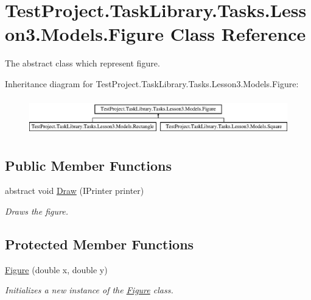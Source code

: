 \hypertarget{class_test_project_1_1_task_library_1_1_tasks_1_1_lesson3_1_1_models_1_1_figure}{}\section{Test\+Project.\+Task\+Library.\+Tasks.\+Lesson3.\+Models.\+Figure Class Reference}
\label{class_test_project_1_1_task_library_1_1_tasks_1_1_lesson3_1_1_models_1_1_figure}


The abstract class which represent figure.  


Inheritance diagram for Test\+Project.\+Task\+Library.\+Tasks.\+Lesson3.\+Models.\+Figure\+:\begin{figure}[H]
\begin{center}
\leavevmode
\includegraphics[height=1.618497cm]{class_test_project_1_1_task_library_1_1_tasks_1_1_lesson3_1_1_models_1_1_figure}
\end{center}
\end{figure}
\subsection*{Public Member Functions}
\begin{DoxyCompactItemize}
\item 
abstract void \mbox{\hyperlink{class_test_project_1_1_task_library_1_1_tasks_1_1_lesson3_1_1_models_1_1_figure_ab736419f3c4dbf51aa758b3d38c10e88}{Draw}} (I\+Printer printer)
\begin{DoxyCompactList}\small\item\em Draws the figure. \end{DoxyCompactList}\end{DoxyCompactItemize}
\subsection*{Protected Member Functions}
\begin{DoxyCompactItemize}
\item 
\mbox{\hyperlink{class_test_project_1_1_task_library_1_1_tasks_1_1_lesson3_1_1_models_1_1_figure_a7ebe78e79c2d0f6337e4f0c7ff580c6c}{Figure}} (double x, double y)
\begin{DoxyCompactList}\small\item\em Initializes a new instance of the \mbox{\hyperlink{class_test_project_1_1_task_library_1_1_tasks_1_1_lesson3_1_1_models_1_1_figure}{Figure}} class. \end{DoxyCompactList}\end{DoxyCompactItemize}
